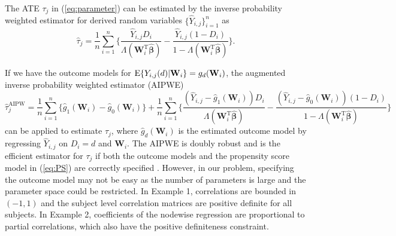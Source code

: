 \documentclass[12pt]{article}
\def\be{\begin{equation}}
\def\ee{\end{equation}}
\def\eea{\end{eqnarray}}
\def\T{{ \mathrm{\scriptscriptstyle T} }}
\def\AI{{ \mathrm{\scriptscriptstyle AIPW} }}
\theoremstyle{definition}
\newcommand{\E}{\rm E}
\newcommand{\bW}{{\mathbf W}}
\newcommand{\bbeta}  {\boldsymbol{\beta}}
\begin{document}
The ATE $\tau_j$ in (\ref{eq:parameter}) can be estimated by the 
inverse probability weighted estimator for 
derived random variables $\{\hat{Y}_{i, j}\}_{i = 1}^{n}$ 
as
\be
\hat{\tau}_j = \frac{1}{n}\sum_{i = 1}^{n}\bigg\{\frac{\hat{Y}_{i, j}D_{i}}{\Lambda(\bW_{i}^{\T}\hat{\bbeta})} - \frac{\hat{Y}_{i, j}(1 - D_{i})}{1 - \Lambda(\bW_{i}^{\T}\hat{\bbeta})}\bigg\}.
\label{eq:EstATE1}\ee 

If we have the outcome models for ${\E}\{Y_{i, j}(d) | \bW_i\} = g_d(\bW_i)$, the augmented inverse probability weighted estimator 
(AIPWE)
$$\hat{\tau}_j^{\AI} = \frac{1}{n}\sum_{i = 1}^{n}\{\hat{g}_1(\bW_i) - \hat{g}_0(\bW_i)\} + \frac{1}{n}\sum_{i = 1}^{n}\bigg\{\frac{(\hat{Y}_{i, j} - \hat{g}_1(\bW_i))D_{i}}{\Lambda(\bW_{i}^{\T}\hat{\bbeta})} - \frac{(\hat{Y}_{i, j} - \hat{g}_0(\bW_i))(1 - D_{i})}{1 - \Lambda(\bW_{i}^{\T}\hat{\bbeta})}\bigg\}$$
can be applied to estimate $\tau_j$,
where $\hat{g}_d(\bW_i)$ is the estimated outcome model by regressing $\hat{Y}_{i, j}$ on $D_i = d$ and $\bW_i$.
The AIPWE is doubly robust and is the efficient estimator for $\tau_j$ if both the outcome models and the propensity score model in (\ref{eq:PS}) are correctly specified \citep{cao2009improving}. However, in our problem, specifying the outcome model may not be easy as the number of parameters is large and the parameter space could be restricted. In Example 1, correlations are bounded in $(-1, 1)$ and the subject level correlation matrices are positive definite for all subjects. In Example 2, coefficients of the nodewise regression are proportional to partial correlations, which also have the positive definiteness constraint.
\end{document}
